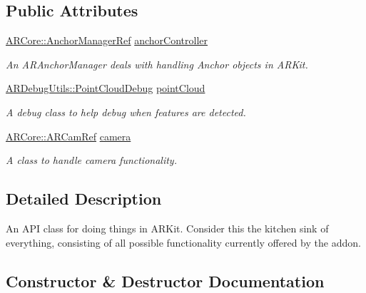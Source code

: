 \subsection*{Public Attributes}
\begin{DoxyCompactItemize}
\item 
\hyperlink{namespace_a_r_core_a3f2b9ba00b51ce19c1010f554a66a512}{A\+R\+Core\+::\+Anchor\+Manager\+Ref} \hyperlink{class_a_r_processor_a8a1a8f16b30d2b0b4839a30d7ba4763d}{anchor\+Controller}
\begin{DoxyCompactList}\small\item\em An A\+R\+Anchor\+Manager deals with handling Anchor objects in A\+R\+Kit. \end{DoxyCompactList}\item 
\hyperlink{class_a_r_debug_utils_1_1_point_cloud_debug}{A\+R\+Debug\+Utils\+::\+Point\+Cloud\+Debug} \hyperlink{class_a_r_processor_a555e829fbf6b625537f6fd7cd9557002}{point\+Cloud}
\begin{DoxyCompactList}\small\item\em A debug class to help debug when features are detected. \end{DoxyCompactList}\item 
\hyperlink{namespace_a_r_core_a4ebe9e23907235fcf76bf65440fde0e0}{A\+R\+Core\+::\+A\+R\+Cam\+Ref} \hyperlink{class_a_r_processor_a0df4995c56cb187db281726d7631d9ed}{camera}
\begin{DoxyCompactList}\small\item\em A class to handle camera functionality. \end{DoxyCompactList}\end{DoxyCompactItemize}


\subsection{Detailed Description}
An A\+PI class for doing things in A\+R\+Kit. Consider this the kitchen sink of everything, consisting of all possible functionality currently offered by the addon. 

\subsection{Constructor \& Destructor Documentation}
\mbox{\label{class_a_r_processor_a8d82301cb64ffc49af9219daeabc9347}} 
